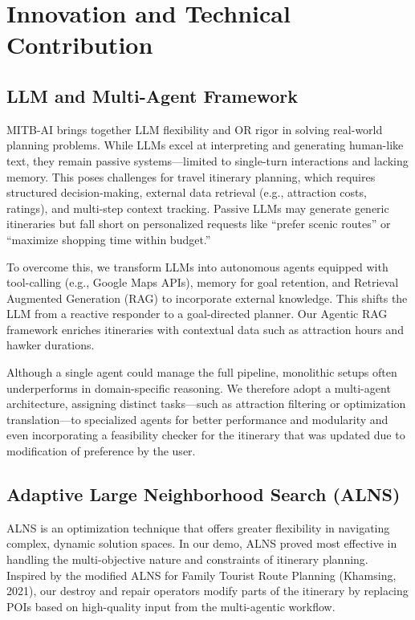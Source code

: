 \documentclass{ecai}
\begin{document}
\section{Innovation and Technical Contribution}
\subsection{LLM and Multi-Agent Framework}
MITB-AI brings together LLM flexibility and OR rigor in solving real-world planning problems.
While LLMs excel at interpreting and generating human-like text, they remain passive systems—limited to single-turn interactions and lacking memory. This poses challenges for travel itinerary planning, which requires structured decision-making, external data retrieval (e.g., attraction costs, ratings), and multi-step context tracking. Passive LLMs may generate generic itineraries but fall short on personalized requests like “prefer scenic routes” or “maximize shopping time within budget.”

To overcome this, we transform LLMs into autonomous agents equipped with tool-calling (e.g., Google Maps APIs), memory for goal retention, and Retrieval Augmented Generation (RAG) to incorporate external knowledge. This shifts the LLM from a reactive responder to a goal-directed planner. Our Agentic RAG framework enriches itineraries with contextual data such as attraction hours and hawker durations.

Although a single agent could manage the full pipeline, monolithic setups often underperforms in domain-specific reasoning. We therefore adopt a multi-agent architecture, assigning distinct tasks—such as attraction filtering or optimization translation—to specialized agents for better performance and modularity and even incorporating a feasibility checker for the itinerary that was updated due to modification of preference by the user.

\subsection{Adaptive Large Neighborhood Search (ALNS)}
ALNS is an optimization technique that offers greater flexibility in navigating complex, dynamic solution spaces. In our demo, ALNS proved most effective in handling the multi-objective nature and constraints of itinerary planning. Inspired by the modified ALNS for Family Tourist Route Planning (Khamsing, 2021), our destroy and repair operators modify parts of the itinerary by replacing POIs based on high-quality input from the multi-agentic workflow. 
\end{document}
